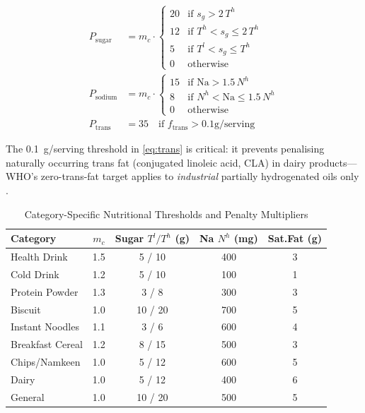 \documentclass[conference]{IEEEtran}
\begin{document}
\begin{align}
P_{\text{sugar}} &= m_c \cdot \begin{cases}
  20 & \text{if } s_g > 2\,T^h \\
  12 & \text{if } T^h < s_g \leq 2\,T^h \\
  5  & \text{if } T^l < s_g \leq T^h \\
  0  & \text{otherwise}
\end{cases} \label{eq:sugar} \\[4pt]
P_{\text{sodium}} &= m_c \cdot \begin{cases}
  15 & \text{if } \text{Na} > 1.5\,N^h \\
  8  & \text{if } N^h < \text{Na} \leq 1.5\,N^h \\
  0  & \text{otherwise}
\end{cases} \label{eq:sodium} \\[4pt]
P_{\text{trans}} &= 35 \quad \text{if } f_{\text{trans}} > 0.1\text{g/serving}
\label{eq:trans}
\end{align}

The 0.1~g/serving threshold in \eqref{eq:trans} is critical: it prevents
penalising naturally occurring trans fat (conjugated linoleic acid, CLA)
in dairy products---WHO's zero-trans-fat target applies to \emph{industrial}
partially hydrogenated oils only \cite{who_trans_fat}.

\begin{table}[ht]
\caption{Category-Specific Nutritional Thresholds and Penalty Multipliers}
\label{tab:thresholds}
\begin{center}
\footnotesize
\begin{tabular}{|l|c|c|c|c|}
\hline
\textbf{Category} & \boldmath$m_c$ & \textbf{Sugar} $T^l/T^h$ (g) & \textbf{Na} $N^h$ (mg) & \textbf{Sat.Fat} (g) \\
\hline
Health Drink  & 1.5 & 5 / 10  & 400  & 3 \\
Cold Drink    & 1.2 & 5 / 10  & 100  & 1 \\
Protein Powder& 1.3 & 3 / 8   & 300  & 3 \\
Biscuit       & 1.0 & 10 / 20 & 700  & 5 \\
Instant Noodles&1.1 & 3 / 6   & 600  & 4 \\
Breakfast Cereal&1.2& 8 / 15  & 500  & 3 \\
Chips/Namkeen & 1.0 & 5 / 12  & 600  & 5 \\
Dairy         & 1.0 & 5 / 12  & 400  & 6 \\
General       & 1.0 & 10 / 20 & 500  & 5 \\
\hline
\end{tabular}
\end{center}
\end{table}
\end{document}
